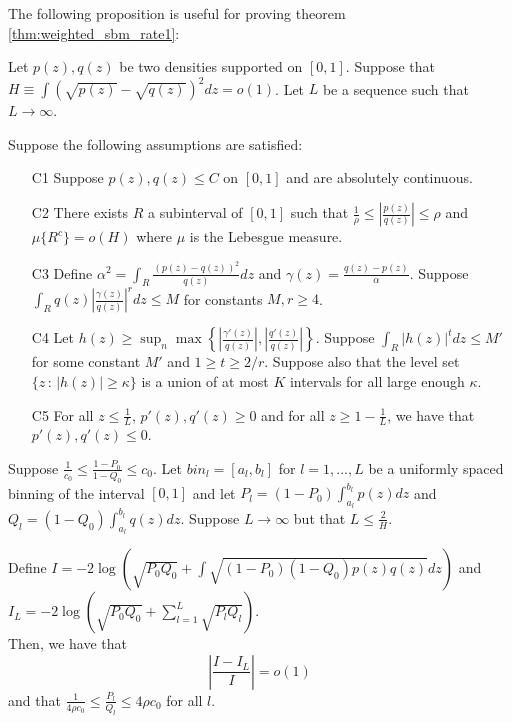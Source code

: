 The following proposition is useful for proving theorem \ref{thm:weighted_sbm_rate1}:
\begin{proposition} 
\label{prop:discretization1}
Let $p(z), q(z)$ be two densities supported on $[0,1]$. Suppose that $H \equiv \int (\sqrt{p(z)} - \sqrt{q(z)})^2 dz = o(1)$. Let $L$ be a sequence such that $L \rightarrow \infty$.


Suppose the following assumptions are satisfied:
\begin{enumerate}
\item[C1] Suppose $p(z), q(z) \leq C$ on $[0,1]$ and are absolutely continuous.
\item[C2] There exists $R$ a subinterval of $[0,1]$ such that $\frac{1}{\rho} \leq \left| \frac{p(z)}{q(z)} \right| \leq \rho$ and $\mu\{R^c\} = o(H)$ where $\mu$ is the Lebesgue measure.

\item[C3] Define $\alpha^2 = \int_R \frac{(p(z) - q(z))^2}{q(z)} dz$ and $\gamma(z) = \frac{q(z) - p(z)}{\alpha}$. Suppose $\int_R q(z) \left| \frac{\gamma(z)}{q(z)} \right|^r dz  \leq M$ for constants $M, r \geq 4$.
\item[C4] Let $h(z) \geq \sup_n \max \left\{  \left|\frac{\gamma'(z)}{q(z)} \right|, 
 \left|\frac{q'(z)}{q(z)}\right|  \right\} $. Suppose $\int_R |h(z)|^t dz \leq M'$ for some constant $M'$ and $1 \geq t \geq 2/r$. Suppose also that the level set $\{z \,:\, |h(z)| \geq \kappa\}$ is a union of at most $K$ intervals for all large enough $\kappa$.  
\item[C5] For all $z \leq \frac{1}{L}$, $p'(z), q'(z) \geq 0$ and for all $z \geq 1 - \frac{1}{L}$, we have that $p'(z), q'(z) \leq 0$.
\end{enumerate}

Suppose $\frac{1}{c_0} \leq \frac{1 - P_0}{1-Q_0} \leq c_0$. Let $bin_l = [a_l, b_l]$ for $l=1,...,L$ be a uniformly spaced binning of the interval $[0,1]$ and let $P_l = (1- P_0) \int_{a_l}^{b_l} p(z) dz$ and $Q_l = (1-Q_0)\int_{a_l}^{b_l} q(z) dz$. Suppose $L \rightarrow \infty$ but that $L \leq \frac{2}{H}$.

Define $I = -2 \log \left( \sqrt{P_0 Q_0} + \int \sqrt{(1-P_0)(1-Q_0) p(z) q(z)} dz \right)$ and $I_L = -2 \log \left( \sqrt{P_0 Q_0} + \sum_{l=1}^L \sqrt{P_l Q_l} \right)$. \\

Then, we have that
 $$\left| \frac{I - I_L}{I} \right| = o(1)$$ 
and that $\frac{1}{4\rho c_0} \leq \frac{P_l}{Q_l} \leq 4\rho c_0$ for all $l$. 
\end{proposition}

